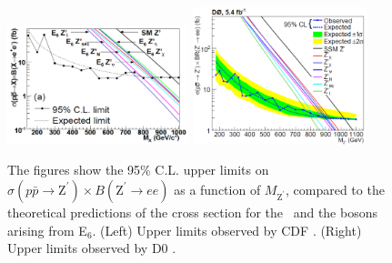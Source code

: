 \begin{itemize}
\begin{figure}[ht]
    \begin{center}
      \includegraphics[width=0.47\textwidth]{figuras/Chapter1/CDFZprime2dielectronfigure.pdf}
      \includegraphics[width=0.45\textwidth]{figuras/Chapter1/D0Zprime2dielectronfigure}
      \caption{The figures show the 95$\%$ C.L. upper limits on
      $\sigma(p\bar{p}\rightarrow \text{Z}^{\prime})\times B(\text{Z}^{\prime}\rightarrow ee)$
      as a function of $M_{\text{Z}^{\prime}}$, compared to the theoretical predictions
      of the cross section for the \ZprimeSSM~and the bosons arising from E$_{6}$. (Left) Upper limits
      observed by CDF \cite{CDFZprimedielectronbib}. (Right) Upper limits observed by D0 \cite{D0Zprimetodielectronbib}.
      } \label{CDFD0dielectronresult}
    \end{center}
\end{figure}


\end{itemize}
